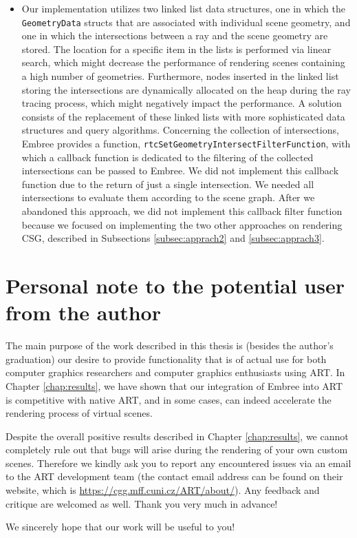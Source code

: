 \begin{itemize}
	\item[] Our implementation utilizes two linked list data structures, one in which the \texttt{GeometryData} structs that are associated with individual scene geometry, and one in which the intersections between a ray and the scene geometry are stored. The location for a specific item in the lists is performed via linear search, which might decrease the performance of rendering scenes containing a high number of geometries. Furthermore, nodes inserted in the linked list storing the intersections are dynamically allocated on the heap during the ray tracing process, which might negatively impact the performance. A solution consists of the replacement of these linked lists with more sophisticated data structures and query algorithms. Concerning the collection of intersections, Embree provides a function, \texttt{rtcSetGeometryIntersectFilterFunction}, with which a callback function is dedicated to the filtering of the collected intersections can be passed to Embree. We did not implement this callback function due to the return of just a single intersection. We needed all intersections to evaluate them according to the scene graph. After we abandoned this approach, we did not implement this callback filter function because we focused on implementing the two other approaches on rendering CSG, described in Subsections \ref{subsec:apprach2} and \ref{subsec:apprach3}.
	
\end{itemize}


\section*{Personal note to the potential user from the author}

The main purpose of the work described in this thesis is (besides the author's graduation) our desire to provide functionality that is of actual use for both computer graphics researchers and computer graphics enthusiasts using ART. In Chapter \ref{chap:results}, we have shown that our integration of Embree into ART is competitive with native ART, and in some cases, can indeed accelerate the rendering process of virtual scenes.

Despite the overall positive results described in Chapter \ref{chap:results}, we cannot completely rule out that bugs will arise during the rendering of your own custom scenes. Therefore we kindly ask you to report any encountered issues via an email to the ART development team (the contact email address can be found on their website, which is \href{https://cgg.mff.cuni.cz/ART/about/}{https://cgg.mff.cuni.cz/ART/about/}). Any feedback and critique are welcomed as well. Thank you very much in advance!

We sincerely hope that our work will be useful to you!